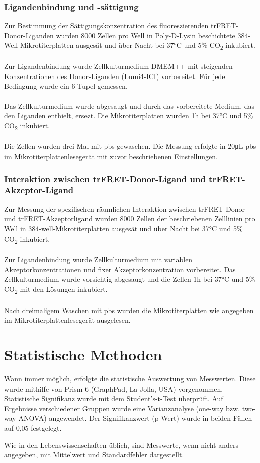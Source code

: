\subsubsection{Ligandenbindung und -sättigung}
Zur Bestimmung der Sättigungskonzentration des fluoreszierenden trFRET-Donor-Liganden wurden 8000 Zellen pro Well in Poly-D-Lysin beschichtete 384-Well-Mikrotiterplatten ausgesät und über Nacht bei 37\si{\celsius} und 5\% CO\textsubscript{2} inkubiert. 
\\ \\
Zur Ligandenbindung wurde Zellkulturmedium DMEM++ mit steigenden Konzentrationen des Donor-Liganden (Lumi4-ICI) vorbereitet. Für jede Bedingung wurde ein 6-Tupel gemessen.
\\ \\
Das Zellkulturmedium wurde abgesaugt und durch das vorbereitete Medium, das den Liganden enthielt, ersezt. Die Mikrotiterplatten wurden 1\si{\hour} bei 37\si{\celsius} und 5\% CO\textsubscript{2} inkubiert.
\\ \\
Die Zellen wurden drei Mal mit \gls{pbs} gewaschen. Die Messung erfolgte in 20\si{\micro\liter} \gls{pbs} im Mikrotiterplattenlesegerät mit zuvor beschriebenen Einstellungen.

\subsubsection{Interaktion zwischen trFRET-Donor-Ligand und trFRET-Akzeptor-Ligand}
Zur Messung der spezifischen räumlichen Interaktion zwischen trFRET-Donor- und trFRET-Akzeptorligand wurden 8000 Zellen der beschriebenen Zelllinien pro Well in 384-well-Mikrotiterplatten ausgesät und über Nacht bei 37\si{\celsius} und 5\% CO\textsubscript{2} inkubiert.
\\ \\
Zur Ligandenbindung wurde Zellkulturmedium mit variablen Akzeptorkonzentrationen und fixer Akzeptorkonzentration vorbereitet. Das Zellkulturmedium wurde vorsichtig abgesaugt und die Zellen 1\si{\hour} bei 37\si{\celsius} und 5\% CO\textsubscript{2} mit den Lösungen inkubiert.
\\ \\  
Nach dreimaligem Waschen mit \gls{pbs} wurden die Mikrotiterplatten wie angegeben im Mikrotiterplattenlesegerät ausgelesen.

\section{Statistische Methoden}
Wann immer möglich, erfolgte die statistische Auswertung von Messwerten. Diese wurde mithilfe von Prism 6 (GraphPad, La Jolla, USA) vorgenommen. Statistische Signifikanz wurde mit dem Student's-t-Test überprüft. Auf Ergebnisse verschiedener Gruppen wurde eine Varianzanalyse (one-way bzw. two-way ANOVA) angewendet. Der Signifikanzwert (p-Wert) wurde in beiden Fällen auf 0,05 festgelegt. 

Wie in den Lebenswissenschaften üblich, sind Messwerte, wenn nicht anders angegeben, mit Mittelwert und Standardfehler dargestellt. 

